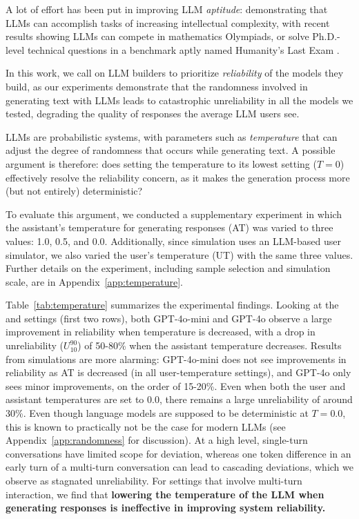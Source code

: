 \documentclass{article}
\begin{document}
A lot of effort has been put in improving LLM \textit{aptitude}: demonstrating that LLMs can accomplish tasks of increasing intellectual complexity, with recent results showing LLMs can compete in mathematics Olympiads, or solve Ph.D.-level technical questions in a benchmark aptly named Humanity's Last Exam \cite{phan2025humanity}.

In this work, we call on LLM builders to prioritize \textit{reliability} of the models they build, as our experiments demonstrate that the randomness involved in generating text with LLMs leads to catastrophic unreliability in all the models we tested, degrading the quality of responses the average LLM users see.

LLMs are probabilistic systems, with parameters such as \textit{temperature} that can adjust the degree of randomness that occurs while generating text. A possible argument is therefore: does setting the temperature to its lowest setting ($T=0$) effectively resolve the reliability concern, as it makes the generation process more (but not entirely) deterministic?

To evaluate this argument, we conducted a supplementary experiment in which the assistant's temperature for generating responses (AT) was varied to three values: 1.0, 0.5, and 0.0. Additionally, since \shardedt simulation uses an LLM-based user simulator, we also varied the user's temperature (UT) with the same three values. Further details on the experiment, including sample selection and simulation scale, are in Appendix~\ref{app:temperature}.



Table~\ref{tab:temperature} summarizes the experimental findings. Looking at the \fullt and \concatt settings (first two rows), both GPT-4o-mini and GPT-4o observe a large improvement in reliability when temperature is decreased, with a drop in unreliability ($U_{10}^{90}$) of 50-80\% when the assistant temperature decreases. Results from \shardedt simulations are more alarming: GPT-4o-mini does not see improvements in reliability as AT is decreased (in all user-temperature settings), and GPT-4o only sees minor improvements, on the order of 15-20\%. Even when both the user and assistant temperatures are set to 0.0, there remains a large unreliability of around 30\%. Even though language models are supposed to be deterministic at $T=0.0$, this is known to practically not be the case for modern LLMs (see Appendix~\ref{app:randomness} for discussion).
At a high level, single-turn conversations have limited scope for deviation, whereas one token difference in an early turn of a multi-turn conversation can lead to cascading deviations, which we observe as stagnated unreliability.
For settings that involve multi-turn interaction, we find that \textbf{lowering the temperature of the LLM when generating responses is ineffective in improving system reliability.}
\end{document}
